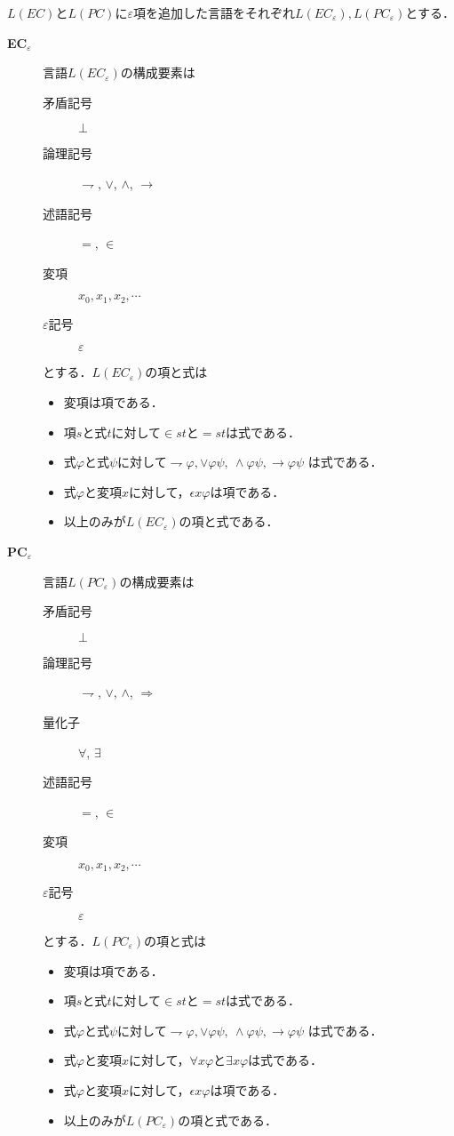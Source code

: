 	$L(EC)$と$L(PC)$に$\varepsilon$項を追加した言語をそれぞれ$L(EC_{\varepsilon}),
	L(PC_{\varepsilon})$とする．
	
	\begin{description}
	\item[{\bf EC${}_{\varepsilon}$}]
	言語$L(EC_{\varepsilon})$の構成要素は
	\begin{description}
		\item[矛盾記号] $\bot$
		\item[論理記号] $\rightharpoondown$, $\vee$, $\wedge$, $\rightarrow$
		\item[述語記号] $=$, $\in$
		\item[変項] $x_{0},x_{1},x_{2},\cdots$
		\item[$\varepsilon$記号] $\varepsilon$
	\end{description}
	とする．$L(EC_{\varepsilon})$の項と式は
	\begin{itemize}
		\item 変項は項である．
		\item 項$s$と式$t$に対して$\in st$と$= st$は式である．
		\item 式$\varphi$と式$\psi$に対して$\rightharpoondown \varphi,
			\vee \varphi \psi,\ \wedge \varphi \psi, \rightarrow \varphi \psi$
			は式である．
		\item 式$\varphi$と変項$x$に対して，$\epsilon x \varphi$は項である．
		\item 以上のみが$L(EC_{\varepsilon})$の項と式である．
	\end{itemize}
	
	\item[{\bf PC${}_{\varepsilon}$}]
	言語$L(PC_{\varepsilon})$の構成要素は
	\begin{description}
		\item[矛盾記号] $\bot$
		\item[論理記号] $\rightharpoondown$, $\vee$, $\wedge$, $\Longrightarrow$
		\item[量化子] $\forall$, $\exists$
		\item[述語記号] $=$, $\in$
		\item[変項] $x_{0},x_{1},x_{2},\cdots$
		\item[$\varepsilon$記号] $\varepsilon$
	\end{description}
	とする．$L(PC_{\varepsilon})$の項と式は
	\begin{itemize}
		\item 変項は項である．
		\item 項$s$と式$t$に対して$\in st$と$= st$は式である．
		\item 式$\varphi$と式$\psi$に対して$\rightharpoondown \varphi,
			\vee \varphi \psi,\ \wedge \varphi \psi, \rightarrow \varphi \psi$
			は式である．
		\item 式$\varphi$と変項$x$に対して，$\forall x \varphi$と$\exists x \varphi$は式である．
		\item 式$\varphi$と変項$x$に対して，$\epsilon x \varphi$は項である．
		\item 以上のみが$L(PC_{\varepsilon})$の項と式である．
	\end{itemize}
	\end{description}
	
